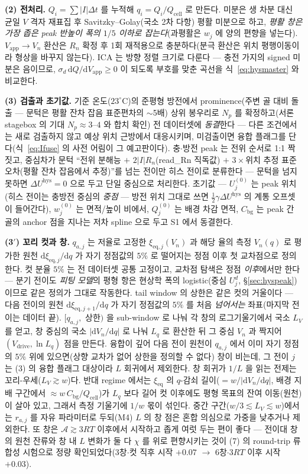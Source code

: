 \documentclass[11pt,a4paper]{article}
\newcommand{\dd}{\mathrm{d}}
\newcommand{\eq}{\mathrm{eq}}
\newcommand{\app}{\mathrm{app}}
\newcommand{\drive}{\mathrm{drive}}
\newcommand{\cell}{\mathrm{cell}}
\newcommand{\bg}{\mathrm{bg}}
\newcommand{\hys}{\mathrm{hys}}
\begin{document}
\textbf{(2) 전처리.} $Q_i=\sum|I|\Delta t$ 를 누적해 $q_i=Q_i/Q_\cell$ 로 만든다. 미분은 생 차분
대신 균일 $V$ 격자 재표집 후 Savitzky--Golay(국소 2차 다항) 평활 미분으로 하고, \emph{평활 창은 가장
좁은 peak 반높이 폭의 $1/5$ 이하로 잡는다}(과평활은 $w_j$ 에 양의 편향을 넣는다). $V_\app\to V_n$ 환산은 $R_n$ 확정 후 1회 재적용으로 충분하다(분극
환산은 위치 평행이동이라 형상을 바꾸지 않는다). ICA 는 방향 정렬 크기로 다룬다 — 충전 가지의 signed
미분은 음이므로, $\sigma_d\,\dd Q/\dd V_\app\ge0$ 이 되도록 부호를 맞춘 곡선을
식~\eqref{eq:hysmaster} 와 비교한다.

\textbf{(3) 검출과 초기값.} 기준 온도($23^\circ$C)의 준평형 방전에서 prominence(주변 골 대비 돌출 — 문턱은 평활 잔차 잡음 표준편차의 $\sim$5배) 상위 봉우리로
$N_p$ 를 확정하고(서론 stagebox 의 기대 $N_p\approx3$--$4$ 와 합치 확인) 전 데이터셋에
\emph{동결}한다 — 다른 조건에서는 새로 검출하지 않고 예상 위치 근방에서
대응시키며, 미검출이면 융합 플래그를 단다(식~\eqref{eq:Ifuse} 의 사전 어림이 그 예고판이다). 충$\cdot$방전 peak 는 전위 순서로 1:1 짝짓고, 중심차가 문턱 ``전위 분해능 $+$ $2|I|R_n$(read\_Rn
직독값) $+$ $3\times$위치 추정 표준오차(평활 잔차 잡음에서 추정)''를 넘는 전이만 히스 전이로 분류한다 — 문턱을
넘지 못하면 $\Delta U^\hys=0$ 으로 두고 단일 중심으로 처리한다. 초기값 — $U_j^{(0)}$ 는 peak 위치(히스 전이는
충방전 중심의 \emph{중점} — 방전 위치 그대로 쓰면 $\tfrac12\gamma\Delta U^\hys$ 의 계통 오프셋이
들어간다), $w_j^{(0)}$ 는 면적/높이 비에서, $Q_j^{(0)}$ 는 배경 차감 면적, $C_\bg$ 는 peak 간 골의
anchor 점을 지나는 저차 spline 으로 두고 S1 에서 동결한다.

\textbf{(3$'$) 꼬리 컷과 창.} $q_{a,j}$ 는 저율로 고정한 $\xi_{\eq,j}(V_n)$ 과 해당 율의 측정
$V_n(q)$ 로 평가한 원천 $\dd\xi_{\eq,j}/\dd q$ 가 자기 정점값의 $5\%$ 로 떨어지는 정점 이후 첫
교차점으로 정의한다. 컷 분율 $5\%$ 는 전 데이터셋 공통 고정이고, 교차점 탐색은 정점 \emph{이후}에서만
한다 — 분기 전이도 \emph{피팅 모델}의 평형 항은 현상학 폭의 logistic(중심 $U_j^d$,
\S\ref{sec:hyspeak})이므로 같은 정의가 그대로 작동한다.
tail window 의 상한은 같은 컷의 거울이다 — 다음 전이의 원천 $\dd\xi_{\eq,j+1}/\dd q$ 가 자기 정점값의
$5\%$ 를 처음 \emph{넘어서는} 좌표(마지막 전이는 데이터 끝). $[q_{a,j},$ 상한$)$ 을 sub-window 로
나눠 각 창의 로그기울기에서 국소 $L_V$ 를 얻고, 창 중심의 국소 $|\dd V_n/\dd q|$ 로 나눠 $L_q$ 로
환산한 뒤 그 중심 $V_n$ 과 짝지어 $(V_\drive,\ln L_q)$ 점을 만든다. 융합이 깊어 다음 전이 원천이 $q_{a,j}$ 에서 이미 자기 정점의 $5\%$ 위에 있으면(상향
교차가 없어 상한을 정의할 수 없다) 창이 비는데, 그 전이 $j$ 는 (3) 의 융합 플래그 대상이라 $L$
회귀에서 제외한다. 창 회귀가 $1/L$ 을 읽는 전제는 꼬리-우세($L_V\gtrsim w$)다. 반대 regime 에서는 $\xi_{\eq}$ 의
$q$-감쇠 길이($=w/|\dd V_n/\dd q|$, 배경 지배 구간에서 $\approx w\,C_\bg/Q_\cell$)가 $L_q$ 보다
길어 컷 이후에도 평형 목표의 잔여 이동(원천)이 살아 있고, 그래서 측정 기울기에 $1/w$ 몫이 섞인다. 중간 구간($w/3\lesssim L_V\lesssim w$)에서는 $r_{a,j}$ 를 자유
파라미터로 두되(M4) $L$ 의 창 점은 혼합 의심으로 가중을 낮추거나 제외한다. 또 창은
$\mathcal A\gtrsim3RT$ 이후에서 시작하고 좁게 여럿 두는 편이 좋다 — 전이대 창의 원천 잔류와 창 내
$L$ 변화가 둘 다 $\chi$ 를 위로 편향시키는 것이 (7) 의 round-trip 류 합성 시험으로 정량
확인되었다(3창$\cdot$컷 직후 시작 $+0.07$ $\to$ 6창$\cdot$$3RT$ 이후 시작 $+0.03$).
\end{document}
